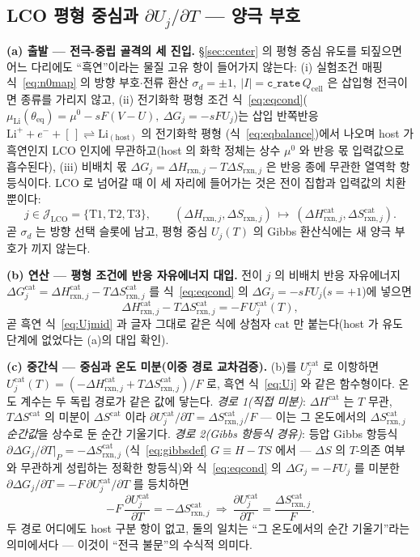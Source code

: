 \documentclass[11pt,a4paper]{article}
\newcommand{\eq}{\mathrm{eq}}
\newcommand{\cell}{\mathrm{cell}}
\newcommand{\rxn}{\mathrm{rxn}}
\newcommand{\code}[1]{\texttt{#1}}
\begin{document}
\subsection{LCO 평형 중심과 $\partial U_j/\partial T$ — 양극 부호}\label{sec:lco-center}
\textbf{(a) 출발 — 전극-중립 골격의 세 진입.}
\S\ref{sec:center} 의 평형 중심 유도를 되짚으면 어느 다리에도 ``흑연''이라는 물질 고유 항이 들어가지
않는다: (i) 실험조건 매핑 식~\eqref{eq:n0map} 의 방향 부호$\cdot$전류 환산
$\sigma_d=\pm1,\ |I|=\code{c\_rate}\,Q_\cell$ 은 삽입형 전극이면 종류를 가리지 않고, (ii) 전기화학 평형
조건 식~\eqref{eq:eqcond}($\mu_\mathrm{Li}(\theta_\eq)=\mu^0-sF(V-U),\ \Delta G_j=-sFU_j$)는 삽입
반쪽반응 $\mathrm{Li}^++e^-+[\,]\rightleftharpoons\mathrm{Li}_{(\text{host})}$ 의 전기화학 평형
(식~\eqref{eq:eqbalance})에서 나오며 host 가 흑연인지 LCO 인지에 무관하고(host 의 화학 정체는 상수
$\mu^0$ 와 반응 몫 입력값으로 흡수된다), (iii) 비배치 몫 $\Delta G_j=\Delta H_{\rxn,j}-T\Delta S_{\rxn,j}$ 은 반응
종에 무관한 열역학 항등식이다. LCO 로 넘어갈 때 이 세 자리에 들어가는 것은 전이 집합과 입력값의 치환뿐이다:
\begin{equation}
j\in\mathcal J_\mathrm{LCO}=\{\mathrm{T1},\mathrm{T2},\mathrm{T3}\},\qquad
(\Delta H_{\rxn,j},\Delta S_{\rxn,j})\ \longmapsto\
(\Delta H_{\rxn,j}^\mathrm{cat},\Delta S_{\rxn,j}^\mathrm{cat}).
\label{eq:lco-n0sub}
\end{equation}
곧 $\sigma_d$ 는 방향 선택 슬롯에 남고, 평형 중심 $U_j(T)$ 의 Gibbs 환산식에는 새 양극 부호가 끼지 않는다.

\textbf{(b) 연산 — 평형 조건에 반응 자유에너지 대입.}
전이 $j$ 의 비배치 반응 자유에너지 $\Delta G_j^\mathrm{cat}=\Delta H_{\rxn,j}^\mathrm{cat}
-T\Delta S_{\rxn,j}^\mathrm{cat}$ 를 식~\eqref{eq:eqcond} 의 $\Delta G_j=-sFU_j$($s=+1$)에 넣으면
\[
\Delta H_{\rxn,j}^\mathrm{cat}-T\Delta S_{\rxn,j}^\mathrm{cat}=-F\,U_j^\mathrm{cat}(T),
\]
곧 흑연 식~\eqref{eq:Ujmid} 과 글자 그대로 같은 식에 상첨자 $\mathrm{cat}$ 만 붙는다(host 가 유도 단계에
없었다는 (a)의 대입 확인).

\textbf{(c) 중간식 — 중심과 온도 미분(이중 경로 교차검증).}
(b)를 $U_j^\mathrm{cat}$ 로 이항하면 $U_j^\mathrm{cat}(T)=(-\Delta H_{\rxn,j}^\mathrm{cat}
+T\Delta S_{\rxn,j}^\mathrm{cat})/F$ 로, 흑연 식~\eqref{eq:Uj} 와 같은 함수형이다. 온도 계수는 두 독립
경로가 같은 값에 닿는다. \emph{경로 1(직접 미분)}: $\Delta H^\mathrm{cat}$ 는 $T$ 무관, $T\Delta S^\mathrm{cat}$
의 미분이 $\Delta S^\mathrm{cat}$ 이라 $\partial U_j^\mathrm{cat}/\partial T=\Delta S_{\rxn,j}^\mathrm{cat}/F$
— 이는 그 온도에서의 $\Delta S_{\rxn,j}^\mathrm{cat}$ \emph{순간값}을 상수로 둔 순간 기울기다.
\emph{경로 2(Gibbs 항등식 경유)}: 등압 Gibbs 항등식 $\partial\Delta G_j/\partial T|_P=-\Delta S_{\rxn,j}^\mathrm{cat}$
(식~\eqref{eq:gibbsdef} $G\equiv H-TS$ 에서 — $\Delta S$ 의 $T$-의존 여부와 무관하게 성립하는 정확한
항등식)와 식~\eqref{eq:eqcond} 의 $\Delta G_j=-FU_j$ 를 미분한
$\partial\Delta G_j/\partial T=-F\,\partial U_j^\mathrm{cat}/\partial T$ 를 등치하면
\[
-F\,\frac{\partial U_j^\mathrm{cat}}{\partial T}=-\Delta S_{\rxn,j}^\mathrm{cat}
\ \Longrightarrow\
\frac{\partial U_j^\mathrm{cat}}{\partial T}=\frac{\Delta S_{\rxn,j}^\mathrm{cat}}{F}.
\]
두 경로 어디에도 host 구분 항이 없고, 둘의 일치는 ``그 온도에서의 순간 기울기''라는 의미에서다 —
이것이 ``전극 불문''의 수식적 의미다.
\end{document}
